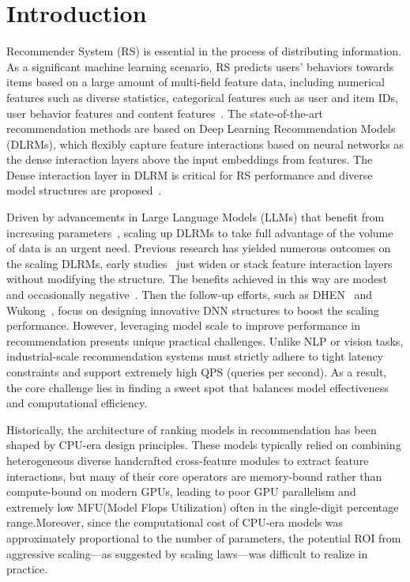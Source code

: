 \section{Introduction}

Recommender System (RS) is essential in the process of distributing information. As a significant machine learning scenario, RS predicts users' behaviors towards items based on a large amount of multi-field feature data, including numerical features such as diverse statistics, categorical features such as user and item IDs, user behavior features and content features~\cite{zhang2021deep,lin2023can}. The state-of-the-art recommendation methods are based on Deep Learning Recommendation Models (DLRMs), which flexibly capture feature interactions based on neural networks as the dense interaction layers above the input embeddings from features. The Dense interaction layer in DLRM is critical for RS performance and diverse model structures are proposed~\cite{covington2016deep,din,guo2017deepfm,wang2021dcn,zhangwukong}.

Driven by advancements in Large Language Models (LLMs) that benefit from increasing parameters~\cite{achiam2023gpt,kaplan2020scaling,hoffmann2022training}, scaling up DLRMs to take full advantage of the volume of data is an urgent need. 
Previous research has yielded numerous outcomes on the scaling DLRMs, early studies~\cite{zhang2024scaling,ardalani2022understanding,chitlangia2023scaling} just widen or stack feature interaction layers without modifying the structure. The benefits achieved in this way are modest and occasionally negative~\cite{wang2017deep,lian2018xdeepfm}. Then the follow-up efforts, such as DHEN~\cite{zhang2022dhen} and Wukong~\cite{zhangwukong}, focus on designing innovative DNN structures to boost the scaling performance. However, leveraging model scale to improve performance in recommendation presents unique practical challenges. Unlike NLP or vision tasks, industrial-scale recommendation systems must strictly adhere to tight latency constraints and support extremely high QPS (queries per second). As a result, the core challenge lies in finding a sweet spot that balances model effectiveness and computational efficiency.

Historically, the architecture of ranking models in recommendation has been shaped by CPU-era design principles. These models typically relied on combining heterogeneous diverse handcrafted cross-feature modules to extract feature interactions, but many of their core operators are memory-bound rather than compute-bound on modern GPUs, leading to poor GPU parallelism and extremely low MFU(Model Flops Utilization) often in the single-digit percentage range.Moreover, since the computational cost of CPU-era models was approximately proportional to the number of parameters, the potential ROI from aggressive scaling—as suggested by scaling laws—was difficult to realize in practice.


